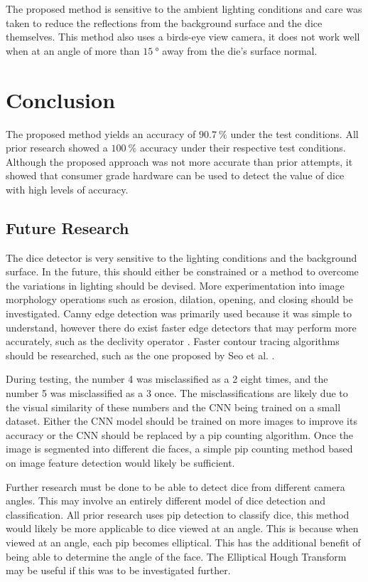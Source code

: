 \documentclass[conference]{IEEEtran}
\begin{document}
The proposed method is sensitive to the ambient lighting conditions and care was taken to reduce the reflections from the background surface and the dice themselves.
This method also uses a birds-eye view camera, it does not work well when at an angle of more than $\SI{15}{\degree}$ away from the die's surface normal.

\section{Conclusion}

The proposed method yields an accuracy of $\SI{90.7}{\percent}$ under the test conditions.
All prior research showed a $\SI{100}{\percent}$ accuracy under their respective test conditions.
Although the proposed approach was not more accurate than prior attempts, it showed that consumer grade hardware can be used to detect the value of dice with high levels of accuracy.

\subsection{Future Research}

The dice detector is very sensitive to the lighting conditions and the background surface.
In the future, this should either be constrained or a method to overcome the variations in lighting should be devised.
More experimentation into image morphology operations such as erosion, dilation, opening, and closing \cite{Szeliski2011} should be investigated.
Canny edge detection was primarily used because it was simple to understand, however there do exist faster edge detectors that may perform more accurately, such as the declivity operator \cite{Mich1995}\cite{Bhardwaj2012}.
Faster contour tracing algorithms should be researched, such as the one proposed by Seo et al. \cite{Seo2016}.

During testing, the number 4 was misclassified as a 2 eight times, and the number 5 was misclassified as a 3 once.
The misclassifications are likely due to the visual similarity of these numbers and the CNN being trained on a small dataset. 
Either the CNN model should be trained on more images to improve its accuracy or the CNN should be replaced by a pip counting algorithm.
Once the image is segmented into different die faces, a simple pip counting method based on image feature detection would likely be sufficient.

Further research must be done to be able to detect dice from different camera angles.
This may involve an entirely different model of dice detection and classification.
All prior research uses pip detection to classify dice, this method would likely be more applicable to dice viewed at an angle.
This is because when viewed at an angle, each pip becomes elliptical.
This has the additional benefit of being able to determine the angle of the face.
The Elliptical Hough Transform \cite{Nair1996} may be useful if this was to be investigated further.

\printbibliography
\end{document}
